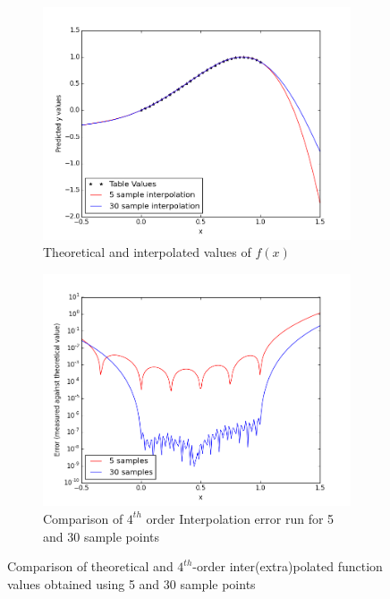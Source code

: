 \documentclass[11pt]{article}
\begin{document}
\begin{figure}
        \centering
        \begin{subfigure}{.5\textwidth}
  \centering
        \includegraphics[width=\linewidth]{q2/interpol.png}
                \caption{Theoretical and interpolated values of $f(x)$}
                \label{fig:q2_inter}
                \end{subfigure}%
\begin{subfigure}{.5\textwidth}
  \centering
        \includegraphics[width=\linewidth]{q2/error_log.png}
                \caption{Comparison of $4^{th}$ order Interpolation error run for 5 and 30 sample points}
                \label{fig:q2_error}
	\end{subfigure}
            
\caption{Comparison of theoretical and $4^{th}$-order inter(extra)polated function values obtained using 5 and 30 sample points}
\label{fig:q2}            
\end{figure}
\end{document}
